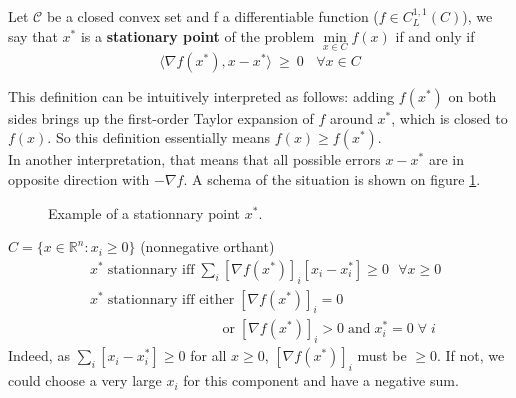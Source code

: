 \begin{definition}
Let $\mathcal{C}$ be a closed convex set and f a differentiable function ($f \in C_L^{1,1}(C)$), we say that $x^*$ is a \textbf{stationary point} of the problem $\min\limits_{x \in C} f(x)$ if and only if
\begin{equation*}
\langle \nabla f(x^*), x-x^* \rangle \ \geq\ 0 \ \ \ \ \forall x \in C
\end{equation*}
\end{definition}
This definition can be intuitively interpreted as follows: adding $f(x^*)$ on both sides brings up the first-order Taylor expansion of $f$ around $x^*$, which is closed to $f(x)$. So this definition essentially means $f(x) \ge f(x^*)$.\\
In another interpretation, that means that all possible errors $x-x^*$ are in opposite direction with $-\nabla f$. A schema of the situation is shown on figure \ref{tik1}.
\begin{figure}[H]
\centering
{}
\caption{Example of a stationnary point $x^*$.}
\label {tik1}
\end{figure}

\begin{example}
\begin{leftbar}
 $C = \{x \in \mathbb{R}^n: x_i \ge 0\}$ (nonnegative orthant)
\begin{align*}
&x^* \; \text{stationnary iff} \; \sum_i \left[\nabla f(x^*)\right]_i \left[x_i - x_i^*\right] \ge 0\ \ \ \forall x\ge 0\\
&x^* \; \text{stationnary iff either} \; [\nabla f(x^*)]_i=0\\ 
&\phantom{x^* \; \text{stationnary iff eith}}\text{or} \; [\nabla f(x^*)]_i>0 \; \text{and} \; x_i^*=0 \; \forall \; i
\end{align*}
Indeed, as $\sum_i [x_i - x_i^*] \ge 0$ for all $x\ge0$,  $[\nabla f(x^*)]_i$ must be $\ge 0$.
If not, we could choose a very large $x_i$ for this component and have a negative sum.
\end{leftbar}
\end{example}

